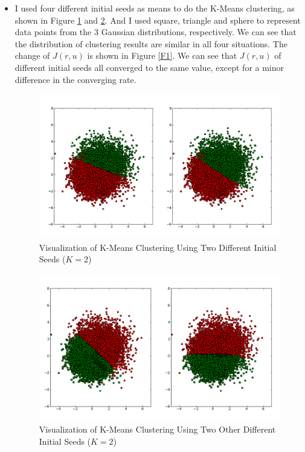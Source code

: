 \begin{itemize}
\item I used four different initial seeds as means to do the K-Means clustering, as shown in Figure \ref{F01} and \ref{F02}. And I used square, triangle and sphere to represent data points from the 3 Gaussian distributions, respectively. We can see that the distribution of clustering results are similar in all four situations. The change of $J(r,u)$ is shown in Figure \ref{F1}. We can see that $J(r,u)$ of different initial seeds all converged to the same value, except for a minor difference in the converging rate. 

\begin{figure}[htb]
\centering
\includegraphics[width=18cm]{F01.png}
\caption{Visualization of K-Means Clustering Using Two Different Initial Seeds ($K=2$)}
\label{F01}
\end{figure}

\begin{figure}[htb]
\centering
\includegraphics[width=18cm]{F02.png}
\caption{Visualization of K-Means Clustering Using Two Other Different Initial Seeds ($K=2$)}
\label{F02}
\end{figure}


\end{itemize}
